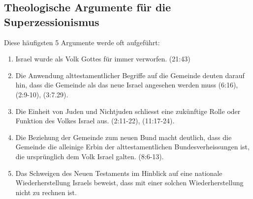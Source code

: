 \documentclass{../../inc/mybib}
\newcommand{\sz}{Superzessionismus}
\begin{document}
    \subsection{Theologische Argumente für die \sz}
    Diese häufigsten 5 Argumente werde oft aufgeführt:
    \begin{enumerate}
        \item Israel wurde als Volk Gottes für immer verworfen. (21:43)
        \item Die Anwendung alttestamentlicher Begriffe auf die Gemeinde deuten darauf hin, dass die Gemeinde als das neue Israel angesehen werden muss (6:16), (2:9-10), (3:7.29).
        \item Die Einheit von Juden und Nichtjuden schliesst eine zukünftige Rolle oder Funktion des Volkes Israel aus. (2:11-22), (11:17-24).
        \item Die Beziehung der Gemeinde zum neuen Bund macht deutlich, dass die Gemeinde die alleinige Erbin der alttestamentlichen Bundesverheissungen ist, die ursprünglich dem Volk Israel galten. (8:6-13).
        \item Das Schweigen des Neuen Testaments im Hinblick auf eine nationale Wiederherstellung Israels beweist, dass mit einer solchen Wiederherstellung nicht zu rechnen ist.
    \end{enumerate}
    \newpage
   
\renewcommand{\arraystretch}{1.3} %
\end{document}
